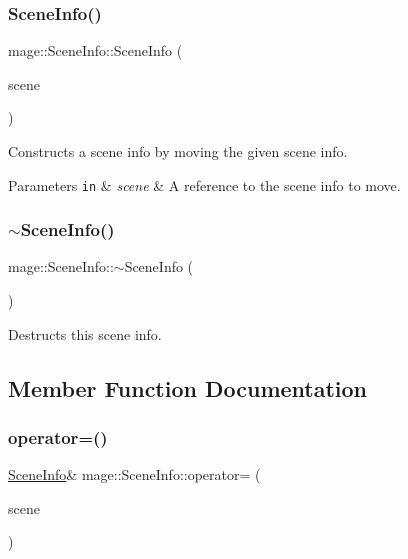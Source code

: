 \subsubsection{\texorpdfstring{Scene\+Info()}{SceneInfo()}\hspace{0.1cm}{\footnotesize\ttfamily [3/3]}}
{\footnotesize\ttfamily mage\+::\+Scene\+Info\+::\+Scene\+Info (\begin{DoxyParamCaption}\item[{\hyperlink{structmage_1_1_scene_info}{Scene\+Info} \&\&}]{scene }\end{DoxyParamCaption})\hspace{0.3cm}{\ttfamily [default]}}

Constructs a scene info by moving the given scene info.


\begin{DoxyParams}[1]{Parameters}
\mbox{\tt in}  & {\em scene} & A reference to the scene info to move. \\
\hline
\end{DoxyParams}
\hypertarget{structmage_1_1_scene_info_ae35c1c6c36aa0bfa8794f2aeb5e10636}{}\label{structmage_1_1_scene_info_ae35c1c6c36aa0bfa8794f2aeb5e10636} 
\subsubsection{\texorpdfstring{$\sim$\+Scene\+Info()}{~SceneInfo()}}
{\footnotesize\ttfamily mage\+::\+Scene\+Info\+::$\sim$\+Scene\+Info (\begin{DoxyParamCaption}{ }\end{DoxyParamCaption})\hspace{0.3cm}{\ttfamily [default]}}

Destructs this scene info. 

\subsection{Member Function Documentation}
\hypertarget{structmage_1_1_scene_info_a785e7ad1ec491dbb657d2f2d11ed77bc}{}\label{structmage_1_1_scene_info_a785e7ad1ec491dbb657d2f2d11ed77bc} 
\subsubsection{\texorpdfstring{operator=()}{operator=()}\hspace{0.1cm}{\footnotesize\ttfamily [1/2]}}
{\footnotesize\ttfamily \hyperlink{structmage_1_1_scene_info}{Scene\+Info}\& mage\+::\+Scene\+Info\+::operator= (\begin{DoxyParamCaption}\item[{const \hyperlink{structmage_1_1_scene_info}{Scene\+Info} \&}]{scene }\end{DoxyParamCaption})\hspace{0.3cm}{\ttfamily [default]}}

